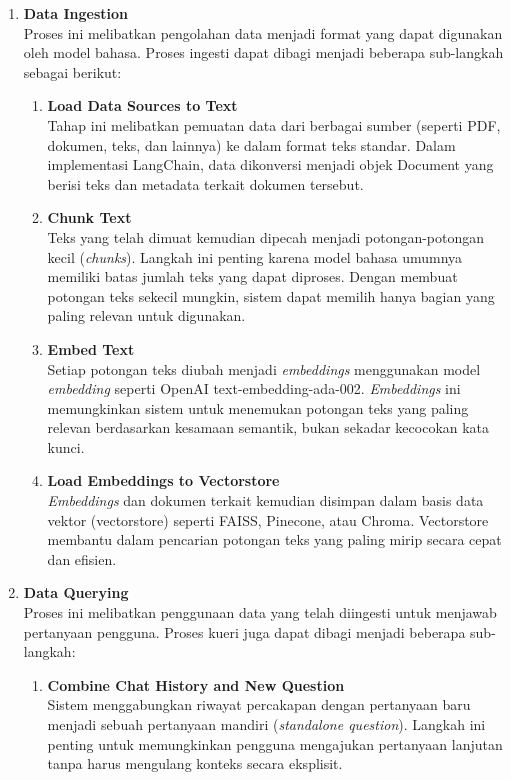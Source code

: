 \begin{enumerate}
  \item \textbf{Data Ingestion} \\
  Proses ini melibatkan pengolahan data menjadi format yang dapat digunakan oleh model bahasa. Proses ingesti dapat dibagi menjadi beberapa sub-langkah sebagai berikut:
  \begin{enumerate}
    \item \textbf{Load Data Sources to Text} \\
    Tahap ini melibatkan pemuatan data dari berbagai sumber (seperti PDF, dokumen, teks, dan lainnya) ke dalam format teks standar. Dalam implementasi LangChain, data dikonversi menjadi objek Document yang berisi teks dan metadata terkait dokumen tersebut.
    \item \textbf{Chunk Text} \\
    Teks yang telah dimuat kemudian dipecah menjadi potongan-potongan kecil (\textit{chunks}). Langkah ini penting karena model bahasa umumnya memiliki batas jumlah teks yang dapat diproses. Dengan membuat potongan teks sekecil mungkin, sistem dapat memilih hanya bagian yang paling relevan untuk digunakan.
    \item \textbf{Embed Text} \\
    Setiap potongan teks diubah menjadi \textit{embeddings} menggunakan model \textit{embedding} seperti OpenAI text-embedding-ada-002. \textit{Embeddings} ini memungkinkan sistem untuk menemukan potongan teks yang paling relevan berdasarkan kesamaan semantik, bukan sekadar kecocokan kata kunci.
    \item \textbf{Load Embeddings to Vectorstore} \\
    \textit{Embeddings} dan dokumen terkait kemudian disimpan dalam basis data vektor (vectorstore) seperti FAISS, Pinecone, atau Chroma. Vectorstore membantu dalam pencarian potongan teks yang paling mirip secara cepat dan efisien.
  \end{enumerate}
  \item \textbf{Data Querying} \\
  Proses ini melibatkan penggunaan data yang telah diingesti untuk menjawab pertanyaan pengguna. Proses kueri juga dapat dibagi menjadi beberapa sub-langkah:
  \begin{enumerate}
    \item \textbf{Combine Chat History and New Question} \\
    Sistem menggabungkan riwayat percakapan dengan pertanyaan baru menjadi sebuah pertanyaan mandiri (\textit{standalone question}). Langkah ini penting untuk memungkinkan pengguna mengajukan pertanyaan lanjutan tanpa harus mengulang konteks secara eksplisit.

\end{enumerate}
\end{enumerate}
